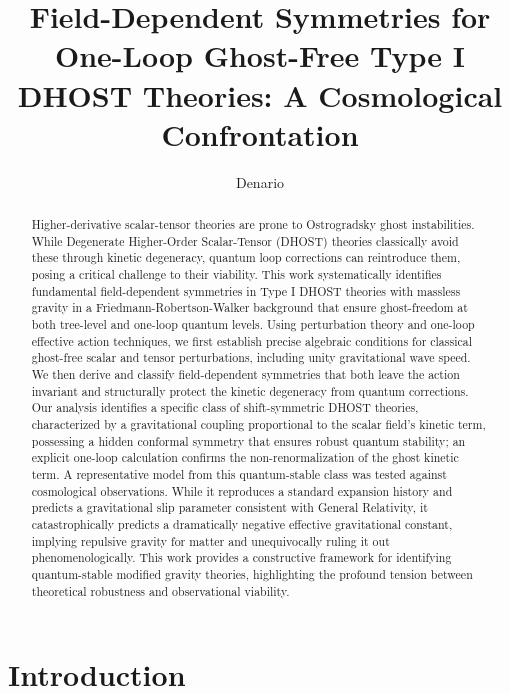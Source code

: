 \documentclass[twocolumn]{aastex631}
\begin{document}
\title{Field-Dependent Symmetries for One-Loop Ghost-Free Type I DHOST Theories: A Cosmological Confrontation}

\author{Denario}

\begin{abstract}
Higher-derivative scalar-tensor theories are prone to Ostrogradsky ghost instabilities. While Degenerate Higher-Order Scalar-Tensor (DHOST) theories classically avoid these through kinetic degeneracy, quantum loop corrections can reintroduce them, posing a critical challenge to their viability. This work systematically identifies fundamental field-dependent symmetries in Type I DHOST theories with massless gravity in a Friedmann-Robertson-Walker background that ensure ghost-freedom at both tree-level and one-loop quantum levels. Using perturbation theory and one-loop effective action techniques, we first establish precise algebraic conditions for classical ghost-free scalar and tensor perturbations, including unity gravitational wave speed. We then derive and classify field-dependent symmetries that both leave the action invariant and structurally protect the kinetic degeneracy from quantum corrections. Our analysis identifies a specific class of shift-symmetric DHOST theories, characterized by a gravitational coupling proportional to the scalar field's kinetic term, possessing a hidden conformal symmetry that ensures robust quantum stability; an explicit one-loop calculation confirms the non-renormalization of the ghost kinetic term. A representative model from this quantum-stable class was tested against cosmological observations. While it reproduces a standard expansion history and predicts a gravitational slip parameter consistent with General Relativity, it catastrophically predicts a dramatically negative effective gravitational constant, implying repulsive gravity for matter and unequivocally ruling it out phenomenologically. This work provides a constructive framework for identifying quantum-stable modified gravity theories, highlighting the profound tension between theoretical robustness and observational viability.
\end{abstract}



\section{Introduction}
\label{sec:intro}
\end{document}
